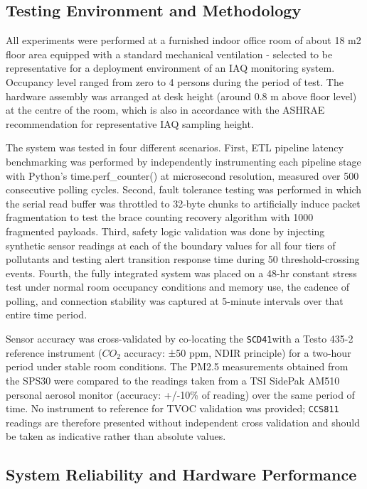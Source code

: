 \documentclass[conference]{IEEEtran}
\begin{document}
\subsection{Testing Environment and Methodology}
All experiments were performed at a furnished indoor office room of about 18 m2 floor area equipped with a standard mechanical ventilation - selected to be representative for a deployment environment of an IAQ monitoring system. Occupancy level ranged from zero to 4 persons during the period of test. The hardware assembly was arranged at desk height (around 0.8 m above floor level) at the centre of the room, which is also in accordance with the ASHRAE recommendation for representative IAQ sampling height.

The system was tested in four different scenarios. First, ETL pipeline latency benchmarking was performed by independently instrumenting each pipeline stage with Python’s time.perf\_counter() at microsecond resolution, measured over 500 consecutive polling cycles. Second, fault tolerance testing was performed in which the serial read buffer was throttled to 32-byte chunks to artificially induce packet fragmentation to test the brace counting recovery algorithm with 1000 fragmented payloads. Third, safety logic validation was done by injecting synthetic sensor readings at each of the boundary values for all four tiers of pollutants and testing alert transition response time during 50 threshold-crossing events. Fourth, the fully integrated system was placed on a 48-hr constant stress test under normal room occupancy conditions and memory use, the cadence of polling, and connection stability was captured at 5-minute intervals over that entire time period.

Sensor accuracy was cross-validated by co-locating the \texttt{SCD41}with a Testo 435-2 reference instrument ($CO_2$ accuracy: ±50 ppm, NDIR principle) for a two-hour period under stable room conditions. The PM2.5 measurements obtained from the SPS30 were compared to the readings taken from a TSI SidePak AM510 personal aerosol monitor (accuracy: +/-10\% of reading) over the same period of time. No instrument to reference for TVOC validation was provided; \texttt{CCS811} readings are therefore presented without independent cross validation and should be taken as indicative rather than absolute values.

\subsection {System Reliability and Hardware Performance}
\end{document}
